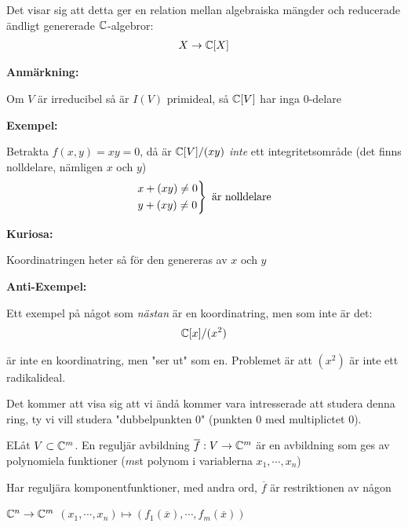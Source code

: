 \noindent Det visar sig att detta ger en relation mellan algebraiska mängder och reducerade ändligt genererade $\mathbb{C}$-algebror:
\begin{equation*}
  \begin{gathered}
    X\to\mathbb{C}[X]
  \end{gathered}
\end{equation*}
\par\bigskip
\noindent\textbf{Anmärkning:}\par
\noindent Om $V$ är irreducibel så är $I(V)$ primideal, så $\mathbb{C}[V]$ har inga 0-delare
\par\bigskip
\noindent\textbf{Exempel:}\par
\noindent Betrakta $f(x,y)=xy=0$, då är $\mathbb{C}[V]/(xy)$ \textit{inte} ett integritetsområde (det finns nolldelare, nämligen $x$ och $y$)
\begin{equation*}
  \begin{gathered}
    \begin{rcases}
      x+(xy)\neq0\\
      y+(xy)\neq0
    \end{rcases}\text{ är nolldelare}
  \end{gathered}
\end{equation*}
\par\bigskip
\noindent\textbf{Kuriosa:}\par
\noindent Koordinatringen heter så för den genereras av $x$ och $y$
\par\bigskip
\noindent\textbf{Anti-Exempel:}\par
\noindent Ett exempel på något som \textit{nästan} är en koordinatring, men som inte är det:
\begin{equation*}
  \begin{gathered}
    \mathbb{C}[x]/(x^2)
  \end{gathered}
\end{equation*}\par
\noindent är inte en koordinatring, men "ser ut" som en. Problemet är att $(x^2)$ är inte ett radikalideal.\par
\noindent Det kommer att visa sig att vi ändå kommer vara intresserade att studera denna ring, ty vi vill studera "dubbelpunkten 0" (punkten 0 med multiplictet 0).
\par\bigskip
\begin{theo}
  ELåt $V\subset\mathbb{C}^m$. En reguljär avbildning $\overline{f}:V\to\mathbb{C}^m$ är en avbildning som ges av polynomiela funktioner ($m$st polynom i variablerna $x_1,\cdots,x_n$)
  \par\bigskip
  \noindent Har reguljära komponentfunktioner, med andra ord, $\overline{f}$ är restriktionen av någon\par
  $\mathbb{C}^n\to\mathbb{C}^m$ $(x_1,\cdots,x_n)\mapsto(f_1(\overline{x}),\cdots,f_m(\overline{x}))$
\end{theo}
